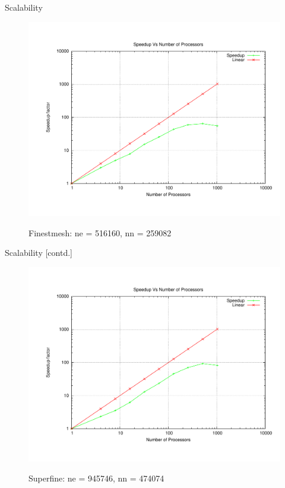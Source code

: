 \documentclass[t,english]{beamer}
\begin{document}
\begin{frame}{Scalability}
\begin{figure}[!htb]
\centering
\includegraphics[trim=0 50 0 120,scale=0.3]{./Timings_1.pdf}

Finestmesh: ne = 516160, nn = 259082
\end{figure}
\end{frame}

\begin{frame}{Scalability [contd.]}
\begin{figure}[!htb]
\centering
\includegraphics[trim=0 50 0 120,scale=0.3]{./Timings_2.pdf}

Superfine: ne = 945746, nn = 474074
\end{figure}
\end{frame}
\end{document}

